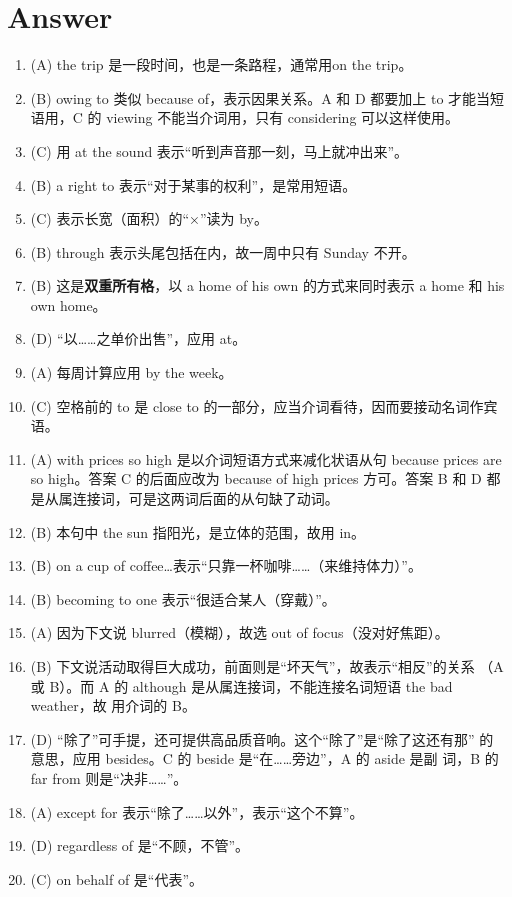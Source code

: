 \section{Answer}
\begin{enumerate}
\item (A) the trip 是一段时间，也是一条路程，通常用on the trip。

\item (B) owing to 类似 because of，表示因果关系。A 和 D 都要加上 to 才能当短语用，C 的 viewing 不能当介词用，只有 considering 可以这样使用。

\item (C) 用 at the sound 表示“听到声音那一刻，马上就冲出来”。


\item  (B) a right to 表示“对于某事的权利”，是常用短语。

\item  (C) 表示长宽（面积）的“×”读为 by。

\item  (B) through 表示头尾包括在内，故一周中只有 Sunday 不开。

\item (B) 这是\textbf{双重所有格}，以 a home of his own 的方式来同时表示 a
  home 和 his own home。

\item  (D) “以……之单价出售”，应用 at。

\item  (A) 每周计算应用 by the week。

\item (C) 空格前的 to 是 close to 的一部分，应当介词看待，因而要接动名词作宾语。

\item (A) with prices so high 是以介词短语方式来减化状语从句 because prices
  are so high。答案 C 的后面应改为 because of high prices 方可。答案 B 和 D
  都是从属连接词，可是这两词后面的从句缺了动词。

\item (B) 本句中 the sun 指阳光，是立体的范围，故用 in。
\item (B) on a cup of coffee…表示“只靠一杯咖啡……（来维持体力）”。
\item (B) becoming to one 表示“很适合某人（穿戴）”。

\item  (A) 因为下文说 blurred（模糊），故选 out of focus（没对好焦距）。
\item (B) 下文说活动取得巨大成功，前面则是“坏天气”，故表示“相反”的关系
  （A 或 B）。而 A 的 although 是从属连接词，不能连接名词短语 the bad weather，故
  用介词的 B。

\item (D) “除了”可手提，还可提供高品质音响。这个“除了”是“除了这还有那” 的
  意思，应用 besides。C 的 beside 是“在……旁边”，A 的 aside 是副
  词，B 的 far from 则是“决非……”。

\item (A) except for 表示“除了……以外”，表示“这个不算”。
\item (D) regardless of 是“不顾，不管”。
\item  (C) on behalf of 是“代表”。

\end{enumerate}

